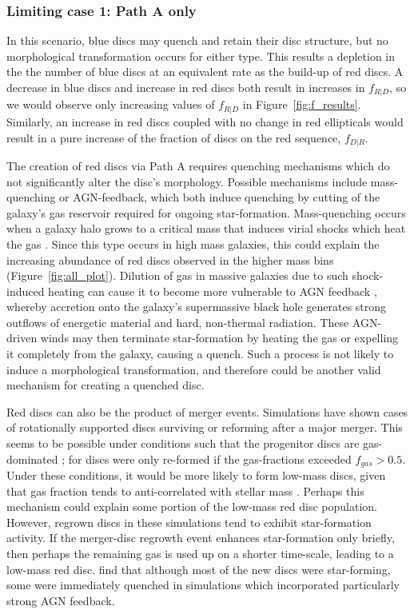 \documentclass[useAMS,usenatbib]{mn2e}
\begin{document}
\subsubsection{Limiting case 1: Path A only}

In this scenario, blue discs may quench and retain their disc structure, but no morphological transformation occurs for either type. This results a depletion in the the number of blue discs at an equivalent rate as the build-up of red discs. A decrease in blue discs and increase in red discs both result in increases in $f_{R|D}$, so we would observe only increasing values of $f_{R|D}$ in Figure~\ref{fig:f_results}. Similarly, an increase in red discs coupled with no change in red ellipticals would result in a pure increase of the fraction of discs on the red sequence, $f_{D|R}$.

The creation of red discs via Path A requires quenching mechanisms which do not significantly alter the disc's morphology. Possible mechanisms include mass-quenching or AGN-feedback, which both induce quenching by cutting of the galaxy's gas reservoir required for ongoing star-formation. Mass-quenching occurs when a galaxy halo grows to a critical mass that induces virial shocks which heat the gas \citep{Schawinski2007,Birnboim2003,Cattaneo2006}. Since this type occurs in high mass galaxies, this could explain the increasing abundance of red discs observed in the higher mass bins (Figure~\ref{fig:all_plot}). Dilution of gas in massive galaxies due to such shock-induced heating can cause it to become more vulnerable to AGN feedback \citep{Dekel2006}, whereby accretion onto the galaxy's supermassive black hole generates strong outflows of energetic material and hard, non-thermal radiation. These AGN-driven winds may then terminate star-formation by heating the gas or expelling it completely from the galaxy, causing a quench. Such a process is not likely to induce a morphological transformation, and therefore could be another valid mechanism for creating a quenched disc.

Red discs can also be the product of merger events. Simulations have shown cases of rotationally supported discs surviving or reforming after a major merger. This seems to be possible under conditions such that the progenitor discs are gas-dominated \citep{Governato2009,Springel2005a}; for \citet{Robertson2006} discs were only re-formed if the gas-fractions exceeded $f_{gas}>0.5$. Under these conditions, it would be more likely to form low-mass discs, given that gas fraction tends to anti-correlated with stellar mass \citep{Kannappan2004,Bell2000}. Perhaps this mechanism could explain some portion of the low-mass red disc population. However, regrown discs in these simulations tend to exhibit star-formation activity. If the merger-disc regrowth event enhances star-formation only briefly, then perhaps the remaining gas is used up on a shorter time-scale, leading to a low-mass red disc. \citet{Sparre2017} find that although most of the new discs were star-forming, some were immediately quenched in simulations which incorporated particularly strong AGN feedback. 
\end{document}

